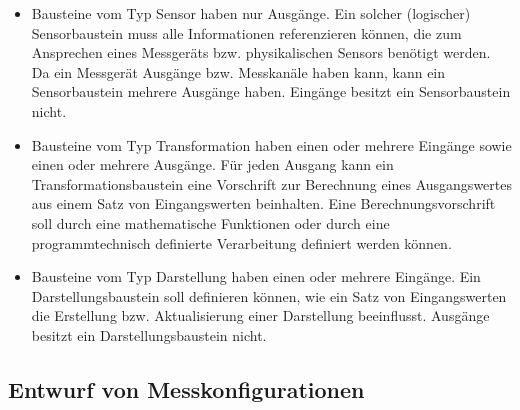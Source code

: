 \documentclass[parskip=full]{scrartcl}
\begin{document}
\begin{itemize}
	
	\item Bausteine vom Typ Sensor haben nur Ausgänge. Ein solcher (logischer) Sensorbaustein muss alle Informationen referenzieren können, die zum Ansprechen eines Messgeräts bzw. physikalischen Sensors benötigt werden. Da ein Messgerät Ausgänge bzw. Messkanäle haben kann, kann ein Sensorbaustein mehrere Ausgänge haben. Eingänge besitzt ein Sensorbaustein nicht. 
	
	\item Bausteine vom Typ Transformation haben einen oder mehrere Eingänge sowie einen oder mehrere Ausgänge. Für jeden Ausgang kann  ein Transformationsbaustein eine Vorschrift zur Berechnung eines Ausgangswertes aus einem Satz von Eingangswerten beinhalten. Eine Berechnungsvorschrift soll durch eine mathematische Funktionen oder durch eine programmtechnisch definierte Verarbeitung definiert werden können.
	
	\item Bausteine vom Typ Darstellung haben einen oder mehrere Eingänge. Ein Darstellungsbaustein soll definieren können, wie ein Satz von Eingangswerten die Erstellung bzw. Aktualisierung einer Darstellung beeinflusst. Ausgänge besitzt ein Darstellungsbaustein nicht.
	
\end{itemize}





\subsection{Entwurf von Messkonfigurationen}
\end{document}
